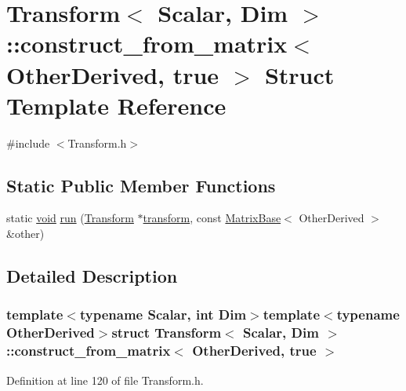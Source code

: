 \hypertarget{struct_transform_1_1construct__from__matrix_3_01_other_derived_00_01true_01_4}{\section{Transform$<$ Scalar, Dim $>$\-:\-:construct\-\_\-from\-\_\-matrix$<$ Other\-Derived, true $>$ Struct Template Reference}
\label{struct_transform_1_1construct__from__matrix_3_01_other_derived_00_01true_01_4}
}


{\ttfamily \#include $<$Transform.\-h$>$}

\subsection*{Static Public Member Functions}
\begin{DoxyCompactItemize}
\item 
static \hyperlink{group___u_a_v_objects_plugin_ga444cf2ff3f0ecbe028adce838d373f5c}{void} \hyperlink{struct_transform_1_1construct__from__matrix_3_01_other_derived_00_01true_01_4_afc64d20459c7b1ac20a2b7bd2efc4329}{run} (\hyperlink{class_transform}{Transform} $\ast$\hyperlink{glext_8h_a07993c0d92c1aeeb357ba0495c8b5325}{transform}, const \hyperlink{class_matrix_base}{Matrix\-Base}$<$ Other\-Derived $>$ \&other)
\end{DoxyCompactItemize}


\subsection{Detailed Description}
\subsubsection*{template$<$typename Scalar, int Dim$>$template$<$typename Other\-Derived$>$struct Transform$<$ Scalar, Dim $>$\-::construct\-\_\-from\-\_\-matrix$<$ Other\-Derived, true $>$}



Definition at line 120 of file Transform.\-h.



